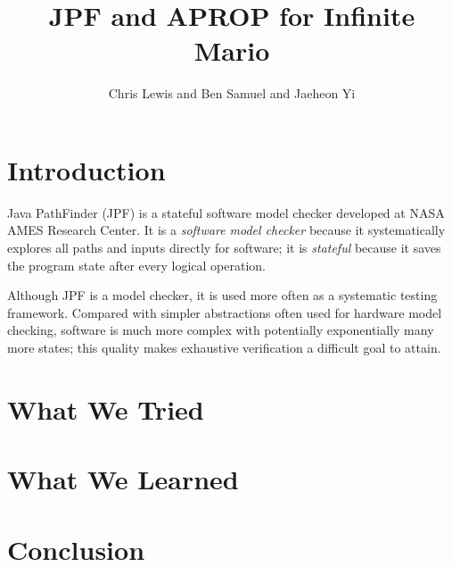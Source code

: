 \documentclass{article}
\title{JPF and APROP for Infinite Mario}
\author{Chris Lewis and Ben Samuel and Jaeheon Yi}
\begin{document}
\maketitle

\section{Introduction}
Java PathFinder (JPF) is a stateful software model checker developed at NASA AMES Research Center. 
It is a \emph{software model checker} because it systematically explores all paths and inputs directly for software;
it is \emph{stateful} because it saves the program state after every logical operation. 

Although JPF is a model checker, it is used more often as a systematic testing framework. 
Compared with simpler abstractions often used for hardware model checking, software is much more complex with potentially exponentially many more states;
this quality makes exhaustive verification a difficult goal to attain. 

\section{What We Tried}

\section{What We Learned}

\section{Conclusion}
\end{document}
